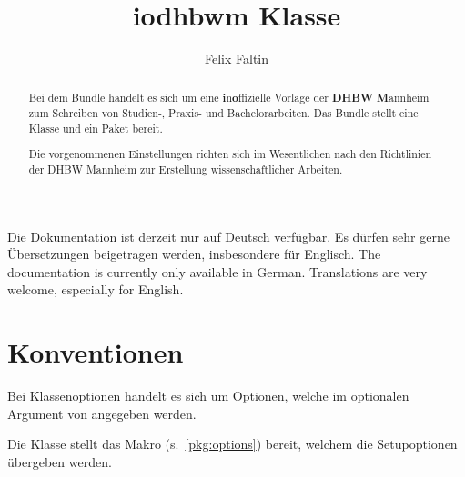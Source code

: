 \documentclass[babel=ngerman,highlight=false]{skdoc}
\title{iodhbwm Klasse}
\author{Felix Faltin}
\begin{document}

    \maketitle

    \begin{info}{}
        Die Dokumentation ist derzeit nur auf Deutsch verfügbar. Es dürfen sehr gerne Übersetzungen beigetragen werden, insbesondere für Englisch.
        \tcbline
        The documentation is currently only available in German. Translations are very welcome, especially for English.
    \end{info}

    \vspace{2\baselineskip}

    \begin{abstract}
        Bei dem Bundle  handelt es sich um eine \textbf{i}n\textbf{o}ffizielle Vorlage der \textbf{DHBW} \textbf{M}annheim zum Schreiben von Studien-, Praxis- und Bachelorarbeiten. Das Bundle stellt eine Klasse  und ein Paket  bereit.

        Die vorgenommenen Einstellungen richten sich im Wesentlichen nach den Richtlinien der DHBW Mannheim zur Erstellung wissenschaftlicher Arbeiten.
    \end{abstract}

    \clearpage

    \tableofcontents

    \section{Konventionen}

    \begin{description}[leftmargin=!, labelwidth=3.5cm]
        \item[\classOption{Klassenoptionen}] Bei Klassenoptionen handelt es sich um Optionen, welche im optionalen Argument von  angegeben werden.
        \item[\setupOption{Setupoption}] Die Klasse stellt das Makro \Macro\dhbwsetup (s.~\ref{pkg:options}) bereit, welchem die Setupoptionen übergeben werden.
    \end{description}
\end{document}

